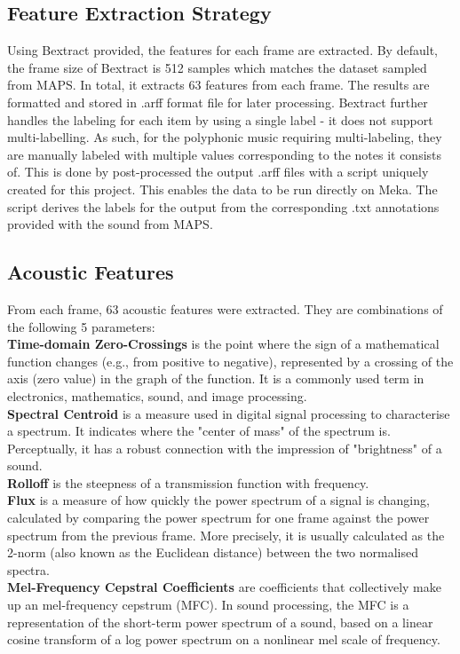 \documentclass{article}
\begin{document}
\subsection{Feature Extraction Strategy}
Using Bextract provided, the features for each frame are extracted. By default, the frame size of Bextract is 512 samples which matches the dataset sampled from MAPS. In total, it extracts 63 features from each frame. The results are formatted and stored in .arff format file for later processing. Bextract further handles the labeling for each item by using a single label - it does not support multi-labelling. As such, for the polyphonic music requiring multi-labeling, they are manually labeled with multiple values corresponding to the notes it consists of. This is done by post-processed the output .arff files with a script uniquely created for this project. This enables the data to be run directly on Meka. The script derives the labels for the output from the corresponding .txt annotations provided with the sound from MAPS. 
\subsection{Acoustic Features}
From each frame, 63 acoustic features were extracted. They are combinations of the following 5 parameters:\\
\textbf{Time-domain Zero-Crossings}  is the point where the sign of a mathematical function changes (e.g.,  from positive to negative), represented by a crossing of the axis (zero value) in the graph of the function\cite{Bundy1984-fo}. It is a commonly used term in electronics, mathematics, sound, and image processing.\\
\textbf{Spectral Centroid} is a measure used in digital signal processing to characterise a spectrum. It indicates where the "center of mass" of the spectrum is. Perceptually, it has a robust connection with the impression of "brightness" of a sound.\\
\textbf{Rolloff} is the steepness of a transmission function with frequency.\\
\textbf{Flux} is a measure of how quickly the power spectrum of a signal is changing, calculated by comparing the power spectrum for one frame against the power spectrum from the previous frame. More precisely, it is usually calculated as the 2-norm (also known as the Euclidean distance) between the two normalised spectra.\\
\textbf{Mel-Frequency Cepstral Coefficients} are coefficients that collectively make up an  mel-frequency cepstrum (MFC). In sound processing, the MFC is a representation of the short-term power spectrum of a sound, based on a linear cosine transform of a log power spectrum on a nonlinear mel scale of frequency.
\end{document}
